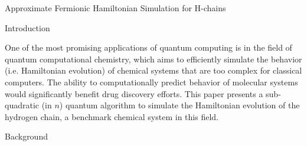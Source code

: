 \documentclass{article}
\begin{document}
Approximate Fermionic Hamiltonian Simulation for H-chains

Introduction

One of the most promising applications of quantum computing is in the field of quantum computational chemistry, which aims to efficiently simulate the behavior (i.e. Hamiltonian evolution) of chemical systems that are too complex for classical computers. The ability to computationally predict behavior of molecular systems would significantly benefit drug discovery efforts. This paper presents a sub-quadratic (in $n$) quantum algorithm to simulate the Hamiltonian evolution of the hydrogen chain, a benchmark chemical system in this field.

Background
\end{document}
